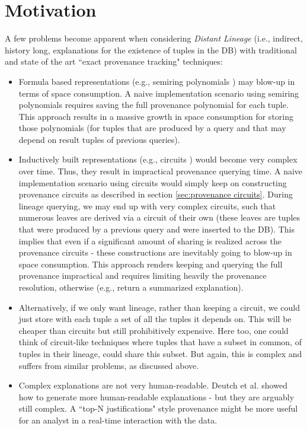 \section{Motivation}\label{sec:motivation_approx}
A few problems become apparent when considering \textit{Distant Lineage} (i.e., indirect, history long, explanations for the existence of tuples in the DB) with traditional and state of the art ``exact provenance tracking" techniques:
\begin{itemize}
    \item Formula based representations (e.g., semiring polynomials \cite{green2007provenance}) may blow-up in terms of space consumption.
    A naive implementation scenario using semiring polynomials requires saving the full provenance polynomial for each tuple. 
    This approach results in a massive growth in space consumption for storing those polynomials (for tuples that are produced by a query and that may depend on result tuples of previous queries).
    \item Inductively built representations (e.g., circuits \cite{Deutch2014, Senellart2017}) would become very complex over time. Thus, they result in impractical provenance querying time. A naive implementation scenario using circuits would simply keep on constructing provenance circuits as described in section \ref{sec:provenance circuits}. During lineage querying, we may end up with very complex circuits, such that numerous leaves are derived via a circuit of their own (these leaves are tuples that were produced by a previous query and were inserted to the DB). This implies that even if a significant amount of sharing is realized across the provenance circuits - these constructions are inevitably going to blow-up in space consumption. This approach renders keeping and querying the full provenance impractical and requires limiting heavily the provenance resolution, otherwise (e.g., return a summarized explanation). 
    \item Alternatively, if we only want lineage, rather than keeping a circuit, we could just store with each tuple a set of all the tuples it depends on. This will be cheaper than circuits but still prohibitively expensive. Here too, one could think of circuit-like techniques where tuples that have a subset in common, of tuples in their lineage, could share this subset. But again, this is complex and suffers from similar problems, as discussed above.
    
    \item Complex explanations are not very human-readable. Deutch et al. \cite{Deutch2017} showed how to generate more human-readable explanations - but they are arguably still complex. A ``top-N justifications" style provenance might be more useful for an analyst in a real-time interaction with the data. 
\end{itemize}


